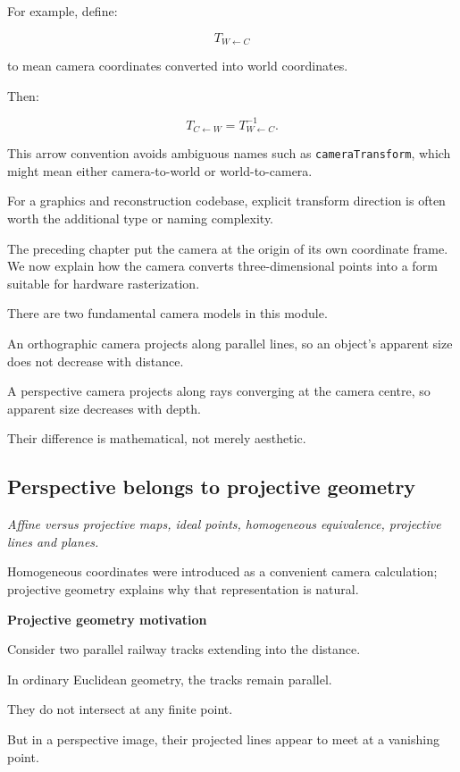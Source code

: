For example, define:

\[
 T_{W\leftarrow C}
\]

to mean camera coordinates converted into world coordinates.

Then:

\[
 T_{C\leftarrow W} = T_{W\leftarrow C}^{-1}.
\]

This arrow convention avoids ambiguous names such as \texttt{cameraTransform}, which might mean either camera-to-world or world-to-camera.

For a graphics and reconstruction codebase, explicit transform direction is often worth the additional type or naming complexity.

The preceding chapter put the camera at the origin of its own coordinate frame. We now explain how the camera converts three-dimensional points into a form suitable for hardware rasterization.

There are two fundamental camera models in this module.

An orthographic camera projects along parallel lines, so an object's apparent size does not decrease with distance.

A perspective camera projects along rays converging at the camera centre, so apparent size decreases with depth.

Their difference is mathematical, not merely aesthetic.

\subsection{Perspective belongs to projective geometry}\label{02-foundations-ii-ch032-perspective-belongs-to-projective-geometry}

\emph{Affine versus projective maps, ideal points, homogeneous equivalence, projective lines and planes.}

Homogeneous coordinates were introduced as a convenient camera calculation; projective geometry explains why that representation is natural.

\textbf{Projective geometry motivation}

Consider two parallel railway tracks extending into the distance.

In ordinary Euclidean geometry, the tracks remain parallel.

They do not intersect at any finite point.

But in a perspective image, their projected lines appear to meet at a vanishing point.

